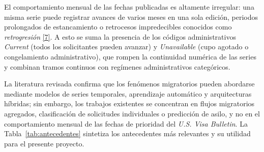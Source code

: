 \documentclass[12pt,letterpaper]{report}
\newcommand{\cita}[1]{\hyperref[bib:#1]{[#1]}}
\begin{document}
El comportamiento mensual de las fechas publicadas es altamente irregular: una misma serie puede registrar avances de varios meses en una sola edición, periodos prolongados de estancamiento o retrocesos impredecibles conocidos como \textit{retrogresión} \cita{7}. A esto se suma la presencia de los códigos administrativos \textit{Current} (todos los solicitantes pueden avanzar) y \textit{Unavailable} (cupo agotado o congelamiento administrativo), que rompen la continuidad numérica de las series y combinan tramos continuos con regímenes administrativos categóricos.

La literatura revisada confirma que los fenómenos migratorios pueden abordarse mediante modelos de series temporales, aprendizaje automático y arquitecturas híbridas; sin embargo, los trabajos existentes se concentran en flujos migratorios agregados, clasificación de solicitudes individuales o predicción de asilo, y no en el comportamiento mensual de las fechas de prioridad del \textit{U.S. Visa Bulletin}. La Tabla~\ref{tab:antecedentes} sintetiza los antecedentes más relevantes y su utilidad para el presente proyecto.
\end{document}
